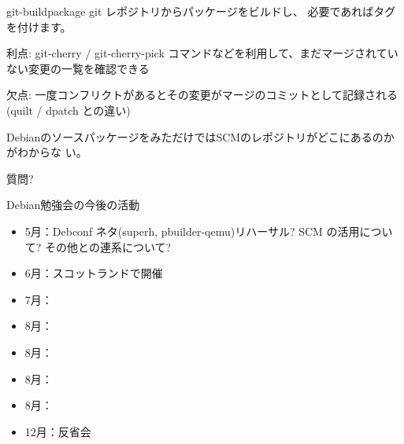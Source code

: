 \documentclass[cjk,dvipdfmx,12pt]{beamer}
\begin{document}
\begin{frame}{git-buildpackage}
 git レポジトリからパッケージをビルドし、
 必要であればタグを付けます。
\end{frame}

\begin{frame}{}

利点: git-cherry / git-cherry-pick コマンドなどを利用して、まだマージされてい
 ない変更の一覧を確認できる

欠点: 一度コンフリクトがあるとその変更がマージのコミットとして記録される
 (quilt / dpatch との違い)

DebianのソースパッケージをみただけではSCMのレポジトリがどこにあるのかがわからな
 い。

\end{frame}

\begin{frame}{}
 
質問?

\end{frame}

\begin{frame}{Debian勉強会の今後の活動}
\begin{itemize}
 \item 5月：Debconf ネタ(superh, pbuilder-qemu)リハーサル? SCM の活用について? その他との連系について?
 \item 6月：スコットランドで開催
 \item 7月：
 \item 8月：
 \item 8月：
 \item 8月：
 \item 8月：
 \item 12月：反省会
\end{itemize}
 
\end{frame}
\end{document}
